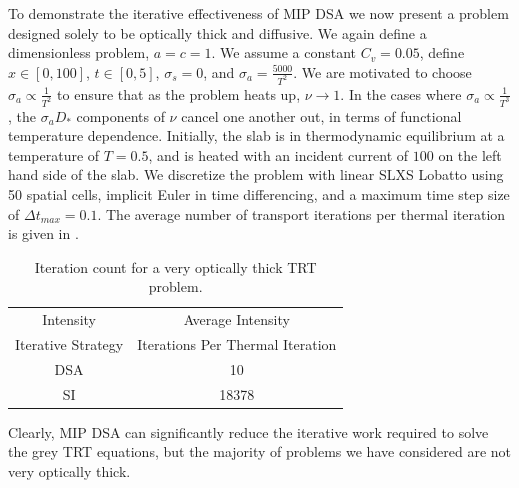 To demonstrate the iterative effectiveness of MIP DSA we now present a problem designed solely to be optically thick and diffusive.
We again define a dimensionless problem, $a=c=1$.
We assume a constant $C_v = 0.05$, define $x\in[0,100]$, $t\in[0,5]$, $\sigma_s = 0$, and $\sigma_a = \frac{5000}{T^2}$.
We are motivated to choose $\sigma_a \propto \frac{1}{T^2}$ to ensure that as the problem heats up, $\nu\to1$.
In the cases where $\sigma_a \propto \frac{1}{T^3}$, the $\sigma_a D_*$ components of $\nu$ cancel one another out, in terms of functional temperature dependence.
Initially, the slab is in thermodynamic equilibrium at a temperature of $T=0.5$, and is heated with an incident current of $100$ on the left hand side of the slab.
We discretize the problem with linear SLXS Lobatto using 50 spatial cells, implicit Euler in time differencing, and a maximum time step size of $\Delta t_{max} = 0.1$.
The average number of transport iterations per thermal iteration is given in .
\begin{table}[!ht]
\centering
\caption{Iteration count for a very optically thick TRT problem.}
\label{tbl:high_iter_count}
\begin{tabular}{|c|c|}
\hline
Intensity  						& Average Intensity					\\				
Iterative Strategy		& Iterations Per Thermal Iteration \\
\hline
DSA		&   10  \\ 
\hline
SI  &   18378 \\
\hline
\end{tabular}
\end{table}
Clearly, MIP DSA can significantly reduce the iterative work required to solve the grey TRT equations, but the majority of problems we have considered are not very optically thick.

